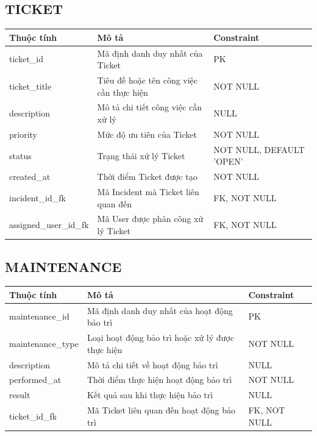 \subsection{TICKET}
\begin{center}
\begin{longtable}{|>{\raggedright\arraybackslash}p{3.5cm}|>{\raggedright\arraybackslash}p{6.5cm}|>{\raggedright\arraybackslash}p{4.5cm}|}
\hline
\textbf{Thuộc tính} & \textbf{Mô tả} & \textbf{Constraint} \\ \hline
\endhead
ticket\_id & Mã định danh duy nhất của Ticket & PK \\ \hline
ticket\_title & Tiêu đề hoặc tên công việc cần thực hiện & NOT NULL \\ \hline
description & Mô tả chi tiết công việc cần xử lý & NULL \\ \hline
priority & Mức độ ưu tiên của Ticket & NOT NULL \\ \hline
status & Trạng thái xử lý Ticket & NOT NULL, DEFAULT 'OPEN' \\ \hline
created\_at & Thời điểm Ticket được tạo & NOT NULL \\ \hline
incident\_id\_fk & Mã Incident mà Ticket liên quan đến & FK, NOT NULL \\ \hline
assigned\_user\_id\_fk & Mã User được phân công xử lý Ticket & FK, NOT NULL \\ \hline
\end{longtable}
\end{center}

\subsection{MAINTENANCE}
\begin{center}
\begin{longtable}{|>{\raggedright\arraybackslash}p{3.5cm}|>{\raggedright\arraybackslash}p{6.5cm}|>{\raggedright\arraybackslash}p{4.5cm}|}
\hline
\textbf{Thuộc tính} & \textbf{Mô tả} & \textbf{Constraint} \\ \hline
\endhead
maintenance\_id & Mã định danh duy nhất của hoạt động bảo trì & PK \\ \hline
maintenance\_type & Loại hoạt động bảo trì hoặc xử lý được thực hiện & NOT NULL \\ \hline
description & Mô tả chi tiết về hoạt động bảo trì & NULL \\ \hline
performed\_at & Thời điểm thực hiện hoạt động bảo trì & NOT NULL \\ \hline
result & Kết quả sau khi thực hiện bảo trì & NULL \\ \hline
ticket\_id\_fk & Mã Ticket liên quan đến hoạt động bảo trì & FK, NOT NULL \\ \hline
\end{longtable}
\end{center}

